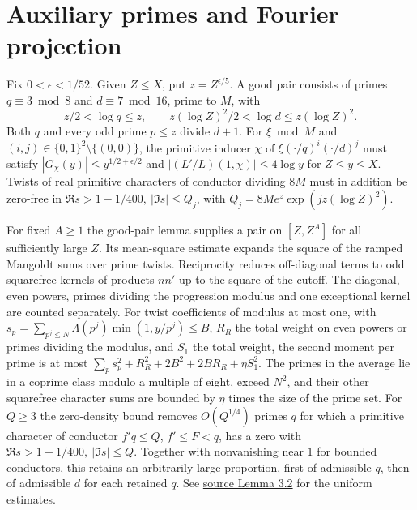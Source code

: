 \documentclass[letterpaper,11pt]{article}
\newcommand{\paperpage}[2]{\href{https://zenodo.org/records/24413008/files/alpoge-rh-exposition.pdf\#page=#1}{#2}}
\begin{document}
\section{Auxiliary primes and Fourier projection}\label{sec:fourier}
Fix \(0<\epsilon<1/52\). Given \(Z\le X\), put \(z=Z^{\epsilon/5}\). A good pair consists of primes \(q\equiv3\bmod8\) and \(d\equiv7\bmod16\), prime to \(M\), with
\[
 z/2<\log q\le z,\qquad z(\log Z)^2/2<\log d\le z(\log Z)^2.
\]
Both \(q\) and every odd prime \(p\le z\) divide \(d+1\). For \(\xi\bmod M\) and \((i,j)\in\{0,1\}^2\setminus\{(0,0)\}\), the primitive inducer \(\chi\) of \(\xi(\cdot/q)^i(\cdot/d)^j\) must satisfy \(|G_\chi(y)|\le y^{1/2+\epsilon/2}\) and \(|(L'/L)(1,\chi)|\le4\log y\) for \(Z\le y\le X\). Twists of real primitive characters of conductor dividing \(8M\) must in addition be zero-free in \(\Re s>1-1/400,\ |\Im s|\le Q_j\), with \(Q_j=8M e^z\exp(jz(\log Z)^2)\).

For fixed \(A\ge1\) the good-pair lemma supplies a pair on \([Z,Z^A]\) for all sufficiently large \(Z\). Its mean-square estimate expands the square of the ramped Mangoldt sums over prime twists. Reciprocity reduces off-diagonal terms to odd squarefree kernels of products \(nn'\) up to the square of the cutoff. The diagonal, even powers, primes dividing the progression modulus and one exceptional kernel are counted separately. For twist coefficients of modulus at most one, with \(s_p=\sum_{p^j\le N}\Lambda(p^j)\min(1,y/p^j)\le B\), \(R_R\) the total weight on even powers or primes dividing the modulus, and \(S_1\) the total weight, the second moment per prime is at most \(\sum_ps_p^2+R_R^2+2B^2+2BR_R+\eta S_1^2\). The primes in the average lie in a coprime class modulo a multiple of eight, exceed \(N^2\), and their other squarefree character sums are bounded by \(\eta\) times the size of the prime set. For \(Q\ge3\) the zero-density bound removes \(O(Q^{1/4})\) primes \(q\) for which a primitive character of conductor \(f'q\le Q\), \(f'\le F<q\), has a zero with \(\Re s>1-1/400,\ |\Im s|\le Q\). Together with nonvanishing near \(1\) for bounded conductors, this retains an arbitrarily large proportion, first of admissible \(q\), then of admissible \(d\) for each retained \(q\). See \paperpage{7}{source Lemma 3.2} for the uniform estimates.
\end{document}
